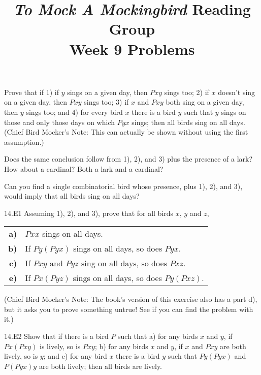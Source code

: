 \documentclass[12pt, letterpaper]{article}
\title{\emph{To Mock A Mockingbird} Reading Group\\Week 9 Problems}
\begin{document}
\maketitle

\disclaimer

\begin{prob}{14.1} 
Prove that if 1) if $y$ sings on a given day, then $Pxy$ sings too; 2) if $x$ doesn't sing on a given day, then $Pxy$ sings too; 3) if $x$ and $Pxy$ both sing on a given day, then $y$ sings too; and 4) for every bird $x$ there is a bird $y$ such that $y$ sings on those and only those days on which $Pyx$ sings; then all birds sing on all days. (Chief Bird Mocker's Note: This can actually be shown without using the first assumption.)
\end{prob}

\begin{prob}{14.2} 
Does the same conclusion follow from 1), 2), and 3) plus the presence of a lark? How about a cardinal? Both a lark and a cardinal?
\end{prob}

\begin{prob}{14.3} 
Can you find a single combinatorial bird whose presence, plus 1), 2), and 3), would imply that all birds sing on all days?
\end{prob}

\begin{prob}{14.E1}
Assuming 1), 2), and 3), prove that for all birds $x$, $y$ and $z$, 
\end{prob}

\begin{tabular}{r l}
    \textbf{a)} & $Pxx$ sings on all days. \\
    \textbf{b)} & If $Py(Pyx)$ sings on all days, so does $Pyx$. \\
    \textbf{c)} & If $Pxy$ and $Pyz$ sing on all days, so does $Pxz$. \\
    \textbf{e)} & If $Px(Pyz)$ sings on all days, so does $Py(Pxz)$.
\end{tabular}

\vspace{6pt}
\noindent (Chief Bird Mocker's Note: The book's version of this exercise also has a part d), but it asks you to prove something untrue! See if you can find the problem with it.)

\begin{prob}{14.E2}
Show that if there is a bird $P$ such that a) for any birds $x$ and $y$, if $Px(Pxy)$ is lively, so is $Pxy$; b) for any birds $x$ and $y$, if $x$ and $Pxy$ are both lively, so is $y$; and c) for any bird $x$ there is a bird $y$ such that $Py(Pyx)$ and $P(Pyx)y$ are both lively; then all birds are lively.
\end{prob}
\end{document}

